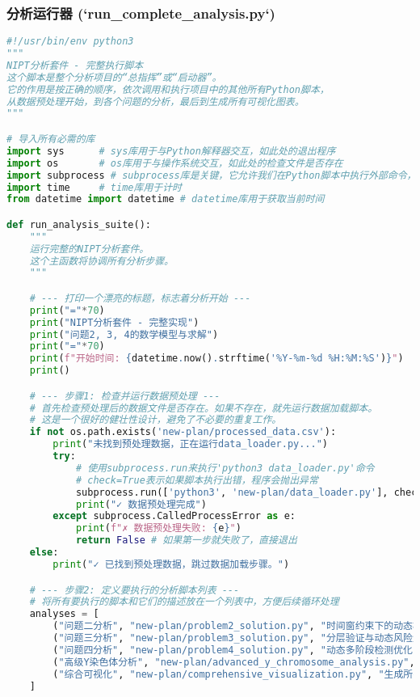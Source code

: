 \documentclass[UTF8, a4paper, 11pt]{ctexart}
\begin{document}
\subsubsection{分析运行器 (`run_complete_analysis.py`)}
\begin{lstlisting}[language=Python, caption={运行完整分析流程的主脚本。}]
#!/usr/bin/env python3
"""
NIPT分析套件 - 完整执行脚本
这个脚本是整个分析项目的“总指挥”或“启动器”。
它的作用是按正确的顺序，依次调用和执行项目中的其他所有Python脚本，
从数据预处理开始，到各个问题的分析，最后到生成所有可视化图表。
"""

# 导入所有必需的库
import sys      # sys库用于与Python解释器交互，如此处的退出程序
import os       # os库用于与操作系统交互，如此处的检查文件是否存在
import subprocess # subprocess库是关键，它允许我们在Python脚本中执行外部命令，就像在终端中输入一样
import time     # time库用于计时
from datetime import datetime # datetime库用于获取当前时间

def run_analysis_suite():
    """
    运行完整的NIPT分析套件。
    这个主函数将协调所有分析步骤。
    """

    # --- 打印一个漂亮的标题，标志着分析开始 ---
    print("="*70)
    print("NIPT分析套件 - 完整实现")
    print("问题2, 3, 4的数学模型与求解")
    print("="*70)
    print(f"开始时间: {datetime.now().strftime('%Y-%m-%d %H:%M:%S')}")
    print()

    # --- 步骤1: 检查并运行数据预处理 ---
    # 首先检查预处理后的数据文件是否存在。如果不存在，就先运行数据加载脚本。
    # 这是一个很好的健壮性设计，避免了不必要的重复工作。
    if not os.path.exists('new-plan/processed_data.csv'):
        print("未找到预处理数据，正在运行data_loader.py...")
        try:
            # 使用subprocess.run来执行'python3 data_loader.py'命令
            # check=True表示如果脚本执行出错，程序会抛出异常
            subprocess.run(['python3', 'new-plan/data_loader.py'], check=True)
            print("✓ 数据预处理完成")
        except subprocess.CalledProcessError as e:
            print(f"✗ 数据预处理失败: {e}")
            return False # 如果第一步就失败了，直接退出
    else:
        print("✓ 已找到预处理数据，跳过数据加载步骤。")

    # --- 步骤2: 定义要执行的分析脚本列表 ---
    # 将所有要执行的脚本和它们的描述放在一个列表中，方便后续循环处理
    analyses = [
        ("问题二分析", "new-plan/problem2_solution.py", "时间窗约束下的动态检测优化"),
        ("问题三分析", "new-plan/problem3_solution.py", "分层验证与动态风险量化"),
        ("问题四分析", "new-plan/problem4_solution.py", "动态多阶段检测优化"),
        ("高级Y染色体分析", "new-plan/advanced_y_chromosome_analysis.py", "独立的Y染色体浓度预测模型"),
        ("综合可视化", "new-plan/comprehensive_visualization.py", "生成所有总结性图表")
    ]


\end{lstlisting}
\end{document}
